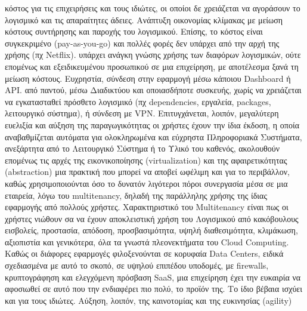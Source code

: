 \documentclass{article}
\begin{document}
\begin{itemize}
     κόστος για τις επιχειρήσεις και τους ιδιώτες, οι οποίοι δε χρειάζεται να αγοράσουν το λογισμικό και τις απαραίτητες άδειες. Ανάπτυξη οικονομίας κλίμακας με μείωση κόστους συντήρησης και παροχής του λογισμικού. Επίσης, το κόστος είναι συγκεκριμένο (pay-as-you-go) και πολλές φορές δεν υπάρχει από την αρχή της χρήσης (πχ Netflix). 
     υπάρχει ανάγκη γνώσης χρήσης των διαφόρων λογισμικών, ούτε επομένως και εξειδικευμένου προσωπικού σε μια επιχείρηση, με αποτέλεσμα ξανά τη μείωση κόστους. Ευχρηστία, σύνδεση στην εφαρμογή μέσω κάποιου Dashboard ή API.
     από παντού, μέσω Διαδικτύου και οποιασδήποτε συσκευής, χωρίς να χρειάζεται να εγκατασταθεί πρόσθετο λογισμικό (πχ dependencies, εργαλεία, packages, λειτουργικό σύστημα), ή σύνδεση με VPN. Επιτυγχάνεται, λοιπόν, μεγαλύτερη ευελιξία και αύξηση της παραγωγικότητας 
     οι χρήστες έχουν την ίδια έκδοση, η οποία αναβαθμίζεται αυτόματα
     για ολοκληρωμένα και εύχρηστα Πληροφοριακά Συστήματα, ανεξάρτητα από το Λειτουργικό Σύστημα ή το Υλικό του καθενός, ακολουθούν επομένως τις αρχές της εικονικοποίησης (virtualization) και της αφαιρετικότητας (abstraction)
     μια πρακτική που μπορεί να αποβεί ωφέλιμη και για το περιβάλλον, καθώς χρησιμοποιούνται όσο το δυνατόν λιγότεροι πόροι 
     συνεργασία μέσα σε μια εταιρεία, λόγω του multitenancy, δηλαδή της παράλληλης χρήσης της ίδιας εφαρμογής από πολλούς χρήστες. Χαρακτηριστικό του Multitenancy είναι πως οι χρήστες νιώθουν σα να έχουν αποκλειστική χρήση του Λογισμικού
     από κακόβουλους εισβολείς, προστασία, απόδοση, προσβασιμότητα, υψηλή διαθεσιμότητα, κλιμάκωση, αξιοπιστία και γενικότερα, όλα τα γνωστά πλεονεκτήματα του Cloud Computing. Καθώς οι διάφορες εφαρμογές φιλοξενούνται σε κορυφαία Data Centers, ειδικά σχεδιασμένα με αυτό το σκοπό, σε υψηλού επιπέδου υποδομές, με firewalls, κρυπτογράφηση και ελεγχόμενη πρόσβαση
     SaaS, μια επιχείρηση έχει την ευκαιρία να αφοσιωθεί σε αυτό που την ενδιαφέρει πιο πολύ, το προϊόν της. Το ίδιο βέβαια ισχύει και για τους ιδιώτες. Αύξηση, λοιπόν, της καινοτομίας και της ευκινησίας (agility)
\end{itemize}
\end{document}
